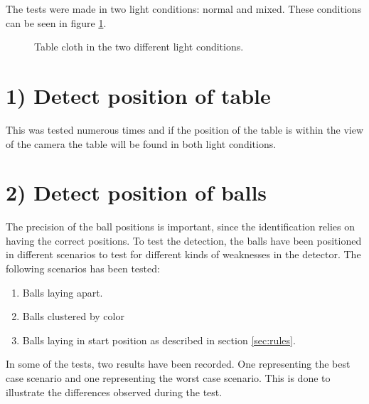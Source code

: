 The tests were made in two light conditions: normal and mixed. These conditions can be seen in figure \ref{fig:difflightcon}.

\begin{figure}[H]
  \centering
  \quad           
   \caption{Table cloth in the two different light conditions.}
  \label{fig:difflightcon}
\end{figure}


\section{1) Detect position of table}

This was tested numerous times and if the position of the table is within the view of the camera the table will be found in both light conditions.

\section{2) Detect position of balls}
The precision of the ball positions is important, since the identification relies on having the correct positions. To test the detection, the balls have been positioned in different scenarios to test for different kinds of weaknesses in the detector. The following scenarios has been tested:
\begin{enumerate}
	\item Balls laying apart.
	\item Balls clustered by color
	\item Balls laying in start position as described in section \ref{sec:rules}.
\end{enumerate}
In some of the tests, two results have been recorded. One representing the best case scenario and one representing the worst case scenario. This is done to illustrate the differences observed during the test.

